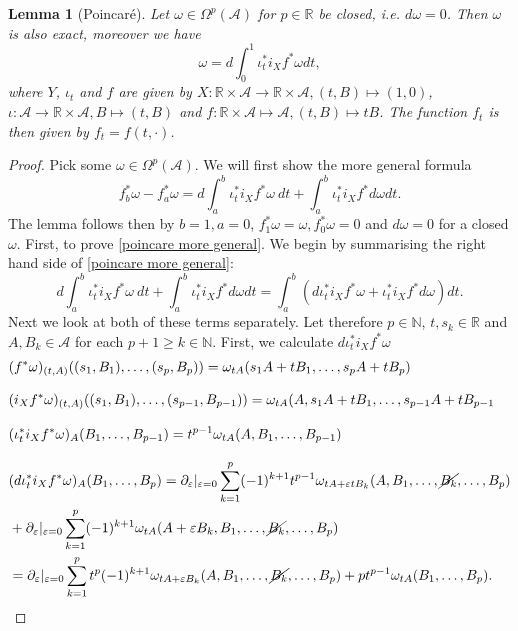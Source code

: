 \documentclass[a4paper,11pt]{article}
\newtheorem{lem}{Lemma}
\begin{document}
\begin{lem}[Poincaré]\label{lem poincare}
Let \(\omega\in \Omega^p(\mathcal{A})\) for \(p\in\mathbb{R}\) be closed, i.e. \(d \omega =0\). Then \(\omega\) is also exact, moreover we have
\begin{equation}
\omega=d \int_{0}^1 \iota^*_t i_X f^* \omega dt,
\end{equation}
where \(Y\), \(\iota_t\) and \(f\) are given by \(X: \mathbb{R}\times\mathcal{A}\rightarrow \mathbb{R}\times\mathcal{A}, (t,B)\mapsto (1,0)\), \(\iota: \mathcal{A}\rightarrow \mathbb{R}\times\mathcal{A}, B\mapsto (t,B)\) and \(f:\mathbb{R}\times \mathcal{A}\mapsto \mathcal{A}, (t,B) \mapsto t B\). The function \(f_t\) is then given by \(f_t=f(t,\cdot)\).
\end{lem}
\begin{proof}
Pick some \(\omega \in \Omega^p(\mathcal{A})\).
We will first show the more general formula 
\begin{equation}\label{poincare more general}
f^*_b\omega-f^*_a \omega=d \int_{a}^b \iota_t^* i_X f^* \omega ~dt+ \int_{a}^b \iota_t^* i_X f^* d \omega dt.
\end{equation}
The lemma follows then by \(b=1, a= 0\), \(f^*_1\omega=\omega, f^*_0 \omega=0\) and \(d \omega=0\) for a closed \(\omega\). 
First, to prove \eqref{poincare more general}. We begin by summarising the right hand side of \eqref{poincare more general}:
\begin{equation}\label{poincare 1 manipulation}
d \int_{a}^b \iota_t^* i_X f^* \omega ~dt+ \int_{a}^b \iota_t^* i_X f^* d \omega dt=
\int_a^b (d\iota_t^* i_X f^* \omega+ \iota_t^* i_X f^* d \omega )dt.
\end{equation}
Next we look at both of these terms separately. Let therefore \(p\in \mathbb{N}\), \(t, s_k\in \mathbb{R}\) and \(A,B_k\in \mathcal{A}\) for each \(p+1\ge k\in\mathbb{N}\).
First, we calculate \(d \iota^*_t i_X f^* \omega\)
\begin{align}
&(f^*\omega)_{(t,A)}((s_1,B_1),\dots, (s_p,B_p))=\omega_{tA}(s_1A+tB_1,\dots, s_p A+t B_p)\\[0.3cm]
&(i_X f^* \omega)_{(t,A)}((s_1,B_1),\dots, (s_{p-1},B_{p-1}))=\omega_{tA}(A,s_1A+tB_1,\dots, s_{p-1}A + t B_{p-1}\\[0.3cm]
&(\iota^*_t i_X f^* \omega)_{A}(B_1,\dots, B_{p-1})= t^{p-1} \omega_{t A}(A,B_1,\dots, B_{p-1})\\[0.3cm]
&(d\iota^*_t i_X f^* \omega)_{A}(B_1,\dots, B_{p})=\partial_\varepsilon |_{\varepsilon=0} \sum_{k=1}^p (-1)^{k+1} t^{p-1} \omega_{t A + \varepsilon t B_k}(A,B_1,\dots, \cancel{B_k},\dots, B_p)\\
&+ \partial_\varepsilon|_{\varepsilon=0} \sum_{k=1}^p (-1)^{k+1} \omega_{tA}(A+\varepsilon B_k,B_1,\dots, \cancel{B_k},\dots, B_p)\\\label{li derivative 1}
&=\partial_{\varepsilon}|_{\varepsilon=0}\sum_{k=1}^p t^p (-1)^{k+1} \omega_{tA+\varepsilon B_k}(A,B_1,\dots, \cancel{B_k},\dots, B_p)+p t^{p-1}\omega_{tA}(B_1,\dots, B_p).
\end{align}



\end{proof}
\end{document}
